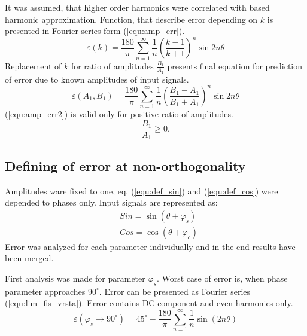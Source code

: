 \documentclass[a4paper]{article}
\begin{document}
It was assumed, that higher order harmonics were correlated with based harmonic approximation. Function, that describe error  depending on $k$ is presented in Fourier series form (\ref{equ:amp_err}).
\begin{equation}
\label{equ:amp_err}
\varepsilon(k) =\frac{180}{\pi}\sum_{n=1}^{\infty}\frac{1}{n}(\frac{k-1}{k+1})^n \sin 2 n \theta
\end{equation}
Replacement of $k$ for ratio of amplitudes $\frac{B_1}{A_1}$ presents final equation for prediction of error due to known amplitudes of input signals.
\begin{equation}
\label{equ:amp_err2}
\varepsilon(A_1, B_1) =\frac{180}{\pi}\sum_{n=1}^{\infty}\frac{1}{n}(\frac{B_1-A_1}{B_1+A_1})^n \sin 2 n \theta
\end{equation}
(\ref{equ:amp_err2}) is valid only for positive ratio of amplitudes.
 $$\frac{B_1}{A_1} \geq 0.$$

\subsection{Defining of error at non-orthogonality}

Amplitudes ware fixed to one, eq. (\ref{equ:def_sin}) and (\ref{equ:def_cos}) were depended to phases only. Input signals are represented as:
\begin{eqnarray}
\label{equ:def_sin_fis}
&Sin = \sin(\theta + \varphi_{s})\\
\label{equ:def_cos_fis}
&Cos =\cos(\theta+\varphi_{c})
\end{eqnarray}
Error was analyzed for each parameter individually and in the end results have been merged.

First analysis was made for parameter $\varphi_s$.
Worst case of error is, when phase parameter approaches $90^\circ$. Error can be presented as Fourier series (\ref{equ:lim_fis_vrsta}). Error contains DC component and even harmonics only.
\begin{equation}
\label{equ:lim_fis_vrsta}
\varepsilon(\varphi_{s} \rightarrow 90^\circ) = 45^\circ - \frac{180}{\pi}\sum_{n=1}^{\infty}\frac{1}{n} \sin (2n \theta)
\end{equation}
\end{document}
